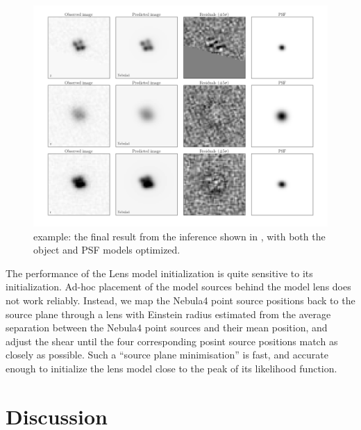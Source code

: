 \documentclass[useAMS,usenatbib]{mn2e}
\begin{document}
\begin{figure}
\centerline{
\includegraphics[width=0.9\linewidth]{figs/H1413+117_10x10arcsec_progress-09_optimizing_Nebula4.png}}
\caption{\LT example: the final result from the inference shown in
, with both the object and PSF models
optimized.}
\label{fig:H1413example-final}
\end{figure}

The performance of the Lens model initialization is quite sensitive to its
initialization. Ad-hoc placement of the model sources behind the 
model lens does not work reliably. Instead, we map the Nebula4 point source
positions back to the source plane through a lens with Einstein radius
estimated from the average separation between the Nebula4 point sources and
their mean position, and adjust the shear until the four corresponding
posint source positions match as closely as possible. Such a ``source plane
minimisation'' is fast, and accurate enough to initialize the lens model
close to the peak of its likelihood function. 





\section{Discussion}
\label{sec:discuss}
\end{document}
